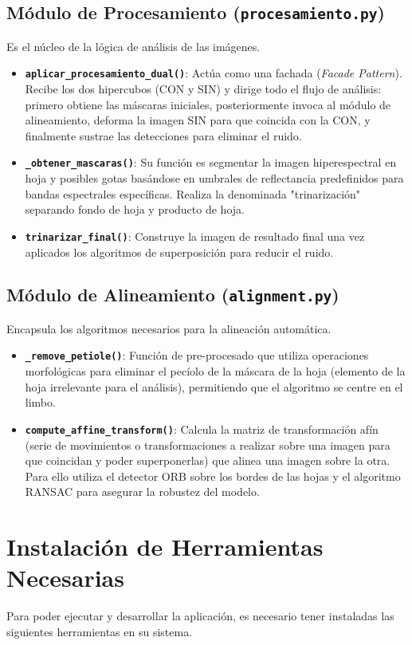 \subsection{Módulo de Procesamiento (\texttt{procesamiento.py})}
Es el núcleo de la lógica de análisis de las imágenes.
\begin{itemize}
 \item \textbf{\texttt{aplicar\_procesamiento\_dual()}}: Actúa como una fachada (\textit{Facade Pattern}). Recibe los dos hipercubos (CON y SIN) y dirige todo el flujo de análisis: primero obtiene las máscaras iniciales, posteriormente invoca al módulo de alineamiento, deforma la imagen SIN para que coincida con la CON, y finalmente sustrae las detecciones para eliminar el ruido.
\item \textbf{\texttt{\_obtener\_mascaras()}}: Su función es segmentar la imagen hiperespectral en hoja y posibles gotas basándose en umbrales de reflectancia predefinidos para bandas espectrales específicas. Realiza la denominada "trinarización" separando fondo de hoja y producto de hoja.
\item \textbf{\texttt{trinarizar\_final()}}: Construye la imagen de resultado final una vez aplicados los algoritmos de superposición para reducir el ruido.
\end{itemize}

\subsection{Módulo de Alineamiento (\texttt{alignment.py})}
Encapsula los algoritmos necesarios para la alineación automática.
\begin{itemize}
\item \textbf{\texttt{\_remove\_petiole()}}: Función de pre-procesado que utiliza operaciones morfológicas para eliminar el pecíolo de la máscara de la hoja (elemento de la hoja irrelevante para el análisis), permitiendo que el algoritmo se centre en el limbo.
\item \textbf{\texttt{compute\_affine\_transform()}}: Calcula la matriz de transformación afín (serie de movimientos o transformaciones a realizar sobre una imagen para que coincidan y poder superponerlas) que alinea una imagen sobre la otra. Para ello utiliza el detector ORB sobre los bordes de las hojas y el algoritmo RANSAC para asegurar la robustez del modelo.
\end{itemize}

\section{Instalación de Herramientas Necesarias}
Para poder ejecutar y desarrollar la aplicación, es necesario tener instaladas las siguientes herramientas en su sistema.

